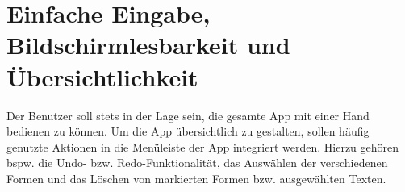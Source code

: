 \section{Einfache Eingabe, Bildschirmlesbarkeit und Übersichtlichkeit}
Der Benutzer soll stets in der Lage sein, die gesamte App mit einer Hand bedienen zu können.
Um die App übersichtlich zu gestalten, sollen häufig genutzte Aktionen in die Menüleiste der App integriert werden.
Hierzu gehören bspw. die Undo- bzw. Redo-Funktionalität, das Auswählen der verschiedenen Formen und das Löschen von markierten Formen bzw. ausgewählten Texten.





